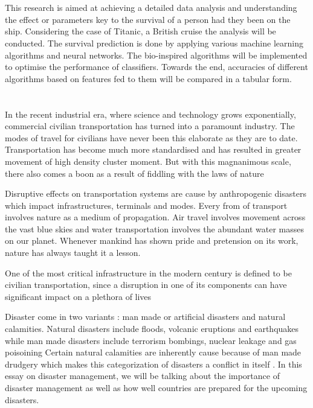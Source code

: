 \documentclass[12pt]{article}
\newcommand{\nd}{\noindent}
\newcommand{\secsize}{\fontsize{15pt}{12pt}\selectfont}
\begin{document}
\large  
\parskip 3mm 
\tableofcontents
\newpage 
\newpage
\section{\textbf{\secsize{ABSTRACT}}}
This research is aimed at achieving a detailed data analysis and understanding the effect or parameters key to the survival of a person had they been on the ship. Considering the case of Titanic, a British cruise the analysis will be conducted. The survival prediction is done by applying various machine learning algorithms and neural networks. The bio-inspired algorithms will be implemented to optimise the performance of classifiers. Towards the end, accuracies of different algorithms based on features fed to them will be compared in a tabular form.
\newpage
\section{\textbf{\secsize{INTRODUCTION}}}
In the recent industrial era, where science and technology grows exponentially, commercial civilian transportation has turned into a paramount industry. The modes of travel for civilians have never been this elaborate as they are to date. Transportation has become much more standardised and has resulted in greater movement of high density cluster moment. But with this magnanimous scale, there also comes a boon as a result of  fiddling with the laws of nature 

\nd Disruptive effects on transportation systems are cause by anthropogenic disasters which impact infrastructures, terminals and modes. Every from of transport involves nature as a medium of propagation. Air travel involves movement across the vast blue skies and water transportation involves the abundant water masses on our planet. Whenever mankind has shown pride and pretension on its work, nature has always taught it a lesson.

\nd One of the most critical infrastructure in the modern century is defined to be civilian transportation, since a disruption in one of its components can have significant impact on a plethora of lives

\nd Disaster come in two variants : man made or artificial disasters and natural calamities. Natural disasters include floods, volcanic eruptions and earthquakes while man made disasters include terrorism bombings, nuclear leakage and gas poisoining  Certain natural calamities are inherently cause because of man made drudgery which makes this categorization of disasters a conflict in itself . In this essay on disaster management, we will be talking about the importance of disaster management as well as how well countries are prepared for the upcoming disasters.
\end{document}
